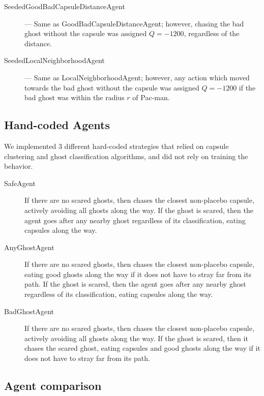 \documentclass[11pt]{amsart}
\begin{document}
\begin{description}
	\item[SeededGoodBadCapsuleDistanceAgent] --- Same as GoodBadCapsuleDistanceAgent; however, chasing the bad ghost without the capsule was assigned $Q = -1200$, regardless of the distance.
	\item[SeededLocalNeighborhoodAgent] --- Same as LocalNeighborhoodAgent; however, any action which moved towards the bad ghost without the capsule was assigned $Q = -1200$ if the bad ghost was within the radius $r$ of Pac-man.
\end{description}

\subsection{Hand-coded Agents}

We implemented 3 different hard-coded strategies that relied on capsule clustering and ghost classification algorithms, and did not rely on training the behavior.
\begin{description}
	\item[SafeAgent] If there are no scared ghosts, then chases the closest non-placebo capsule, actively avoiding all ghosts along the way. If the ghost is scared, then the agent goes after any nearby ghost regardless of its classification, eating capsules along the way. 
	\item[AnyGhostAgent] If there are no scared ghosts, then chases the closest non-placebo capsule, eating good ghosts along the way if it does not have to stray far from its path. If the ghost is scared, then the agent goes after any nearby ghost regardless of its classification, eating capsules along the way. 
	\item[BadGhostAgent] If there are no scared ghosts, then chases the closest non-placebo capsule, actively avoiding all ghosts along the way. If the ghost is scared, then it chases the scared ghost, eating capsules and good ghosts along the way if it does not have to stray far from its path.
\end{description}

\subsection{Agent comparison}
\end{document}
